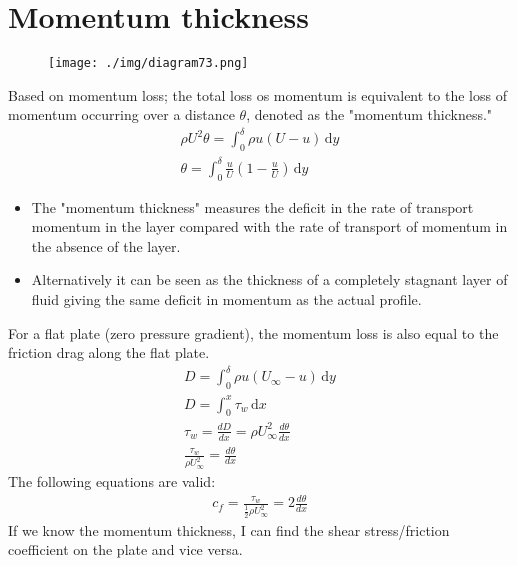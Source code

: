 \section{Momentum thickness}
\begin{figure}[H]
  \centering
  \texttt{[image: ./img/diagram73.png]}
\end{figure}
Based on momentum loss; the total loss os momentum is equivalent to the loss of momentum occurring over a distance $\theta$, denoted as the "momentum thickness."
\begin{gather}
  \rho U^2 \theta = \int_{0}^{\delta} \rho u (U - u) \,\mathrm{d}y\\
  \theta = \int_{0}^{\delta} \frac{u}{U} \left(1 - \frac{u}{U}\right) \,\mathrm{d}y
\end{gather}
\begin{itemize}
  \item The "momentum thickness" measures the deficit in the rate of transport momentum in the layer compared with the rate of transport of momentum in the absence of the layer.
  \item Alternatively it can be seen as the thickness of a completely stagnant layer of fluid giving the same deficit in momentum as the actual profile.
\end{itemize}
For a flat plate (zero pressure gradient), the momentum loss is also equal to the friction drag along the flat plate.
\begin{gather}
  D = \int_{0}^{\delta} \rho u (U_\infty - u) \,\mathrm{d}y\\
  D = \int_{0}^{x} \tau_w \,\mathrm{d}x\\
  \tau_w = \frac{dD}{dx} = \rho U_\infty^2 \frac{d\theta}{dx}\\
  \frac{\tau_w}{\rho U_\infty^2} = \frac{d\theta}{dx}
\end{gather}
The following equations are valid:
\begin{align}
  c_f = \frac{\tau_w}{\frac{1}{2}\rho U_\infty^2} = 2\frac{d\theta}{dx}
\end{align}
If we know the momentum thickness, I can find the shear stress/friction coefficient on the plate and vice versa.
